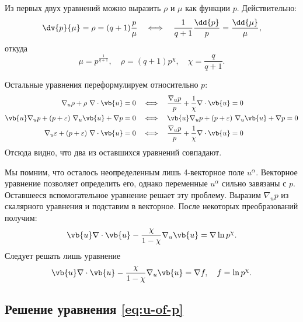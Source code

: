 \documentclass[\docroot/reports/draft/report.tex]{subfiles}
\begin{document}
    Из первых двух уравнений можно выразить $\rho$ и $\mu$ как функции $p$. Действительно:
    \begin{equation*}
        \dv{p}{\mu} = \rho = (q + 1) \frac{p}{\mu} \quad\Longleftrightarrow\quad
        \frac{1}{q + 1} \frac{\dd{p}}{p} = \frac{\dd{\mu}}{\mu} ,
    \end{equation*}
    откуда
    \begin{equation*}
        \mu = p^{\frac{1}{q + 1}} , \quad \rho = (q + 1) p^{\chi} , \quad \chi = \frac{q}{q + 1} .
    \end{equation*}

    Остальные уравнения переформулируем относительно $p$:
    \begin{align*}
        \nabla_u \rho + \rho\ \nabla \cdot \vb{u} = 0 \quad&\Longleftrightarrow\quad
        \frac{\nabla_u p}{p} + \frac{1}{\chi} \nabla \cdot \vb{u} = 0 \\
        \vb{u} \nabla_u p + (p + \varepsilon)\ \nabla_u \vb{u} + \nabla p = 0 \quad&\Longleftrightarrow\quad
        \vb{u} \nabla_u p + (p + \varepsilon)\ \nabla_u \vb{u} + \nabla p = 0 \\
        \nabla_u \varepsilon + (p + \varepsilon)\ \nabla \cdot \vb{u} = 0 \quad&\Longleftrightarrow\quad
        \frac{\nabla_u p}{p} + \frac{1}{\chi} \nabla \cdot \vb{u} = 0
    \end{align*}
    Отсюда видно, что два из оставшихся уравнений совпадают.

    Мы помним, что осталось неопределенным лишь 4-векторное поле $u^\alpha$. Векторное уравнение позволяет определить его, однако переменные $u^\alpha$ сильно завязаны с $p$. Оставшееся вспомогательное уравнение решает эту проблему. Выразим $\nabla_u p$ из скалярного уравнения и подставим в векторное. После некоторых преобразований получим:
    \begin{equation}
        \vb{u} \nabla \cdot \vb{u} - \frac{\chi}{1 - \chi} \nabla_u \vb{u} = \nabla \ln p^{\chi} .
    \end{equation}
    Следует решать лишь уравнение
    \begin{equation}\label{eq:u-of-p}
        \vb{u} \nabla \cdot \vb{u} - \frac{\chi}{1 - \chi} \nabla_u \vb{u} = \nabla f , \quad f = \ln p^{\chi} .
    \end{equation}

\subsection{Решение уравнения \autoref{eq:u-of-p}}
\end{document}
